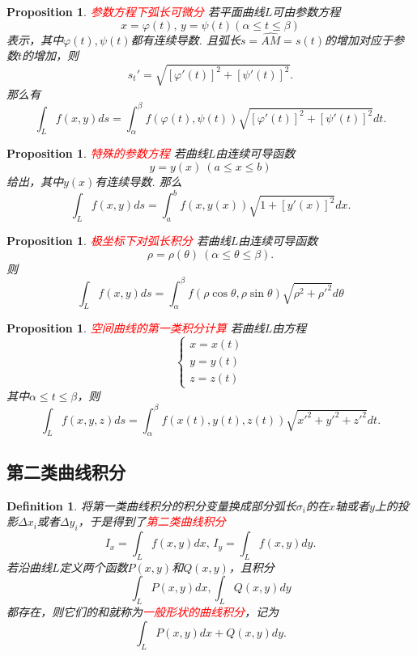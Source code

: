\documentclass{article}
\newtheorem{proposition}[theorem]{Proposition}
\newtheorem{definition}[theorem]{Definition}
\newcommand{\redt}[1]{\textcolor{red}{#1}}
\begin{document}
\begin{proposition}
\rm \redt{参数方程下弧长可微分} 若平面曲线$L$可由参数方程
$$
x = \varphi(t), \, y = \psi(t) (\alpha \leq t \leq \beta)
$$
表示，其中$\varphi(t),\psi(t)$都有连续导数. 且弧长$s = \widehat{AM} = s(t)$的增加对应于参数$t$的增加，则
$$
s_t' = \sqrt{[\varphi'(t)]^2+[\psi'(t)]^2}.
$$
那么有
$$
\int_L f(x,y)ds = \int_\alpha^\beta f(\varphi(t),\psi(t))\sqrt{[\varphi'(t)]^2+[\psi'(t)]^2}dt. 
$$
\end{proposition}

\begin{proposition}
\rm \redt{特殊的参数方程} 若曲线$L$由连续可导函数
$$
y=y(x) ~ (a \leq x \leq b)
$$
给出，其中$y(x)$有连续导数. 那么
$$
\int_L f(x,y)ds = \int_a^b f(x,y(x))\sqrt{1+ [y'(x)]^2}dx. 
$$
\end{proposition}

\begin{proposition}
\rm \redt{极坐标下对弧长积分} 若曲线$L$由连续可导函数
$$
\rho = \rho(\theta) ~ (\alpha \leq \theta \leq \beta).
$$
则
$$
\int_L f(x,y)ds = \int_\alpha^\beta f(\rho\cos\theta,\rho\sin\theta)\sqrt{\rho^2+\rho'^2}d\theta
$$
\end{proposition}

\begin{proposition}
\rm \redt{空间曲线的第一类积分计算} 若曲线$L$由方程
$$
\left\{
\begin{array}{ll}
x = x(t)\\
y = y(t)\\
z = z(t) 
\end{array} \right.
$$
其中$\alpha \leq t \leq \beta$，则
$$
\int_L f(x,y,z)ds = \int_\alpha^{\beta} f(x(t),y(t),z(t))\sqrt{x'^2 + y'^2 + z'^2}dt.
$$
\end{proposition}

\subsection{第二类曲线积分}

\begin{definition}
\rm 将第一类曲线积分的积分变量换成部分弧长$\sigma_i$的在$x$轴或者$y$上的投影$\Delta x_i$或者$\Delta y_i$，于是得到了\redt{第二类曲线积分}
$$
I_x = \int_L f(x,y)dx,\, I_y = \int_L f(x,y)dy.
$$
若沿曲线$L$定义两个函数$P(x,y)$和$Q(x,y)$，且积分
$$
\int_L P(x,y)dx , \int_L Q(x,y)dy 
$$
都存在，则它们的和就称为\redt{一般形状的曲线积分}，记为
$$
\int_L P(x,y)dx + Q(x,y)dy.
$$
\end{definition}
\end{document}
